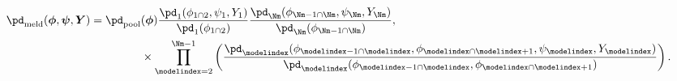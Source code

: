 \begin{equation}
  \begin{aligned}
  \pd_{\text{meld}} (\boldsymbol{\phi}, \boldsymbol{\psi}, \boldsymbol{Y}) =
    \pd_{\text{pool}}&(\boldsymbol{\phi})
    \frac {
      \pd_{1} (\phi_{1 \cap 2}, \psi_{1}, Y_{1})
    } {
      \pd_{1}(\phi_{1 \cap 2})
    }
    \frac {
      \pd_{\Nm} (\phi_{\Nm - 1 \cap \Nm}, \psi_{\Nm}, Y_{\Nm})
    } {
      \pd_{\Nm}(\phi_{\Nm - 1 \cap \Nm})
    }, \\
    &\times \prod_{\modelindex = 2}^{\Nm - 1} \left(
      \frac {
        \pd_{\modelindex} (\phi_{\modelindex - 1 \cap \modelindex}, \phi_{\modelindex \cap \modelindex + 1}, \psi_{\modelindex}, Y_{\modelindex})
      } {
        \pd_{\modelindex}(\phi_{\modelindex - 1 \cap \modelindex}, \phi_{\modelindex \cap \modelindex + 1})
      }
    \right).
  \end{aligned}
  \label{eqn:melded-model-general}
\end{equation}